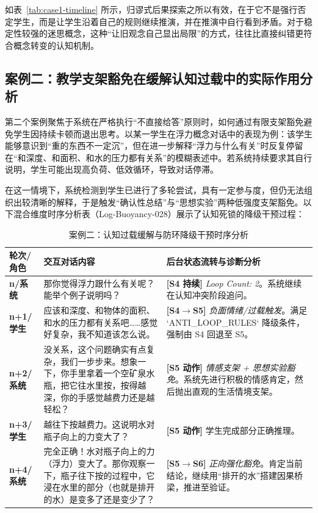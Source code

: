 如表~\ref{tab:case1-timeline} 所示，归谬式后果探索之所以有效，在于它不是强行否定学生，而是让学生沿着自己的规则继续推演，并在推演中自行看到矛盾。对于稳定性较强的迷思概念，这种“让旧观念自己显出局限”的方式，往往比直接纠错更符合概念转变的认知机制\cite{posner1982accommodation,chi1994things}。

\subsection{案例二：教学支架豁免在缓解认知过载中的实际作用分析}
\label{sec:4.6.2}

第二个案例聚焦于系统在严格执行“不直接给答”原则时，如何通过有限支架豁免避免学生因持续卡顿而退出思考。以某一学生在浮力概念对话中的表现为例：该学生能够意识到“重的东西不一定沉”，但在进一步解释“浮力与什么有关”时反复停留在“和深度、和面积、和水的压力都有关系”的模糊表述中。若系统持续要求其自行说明，学生可能出现高负荷、低效循环，导致对话停滞。

在这一情境下，系统检测到学生已进行了多轮尝试，具有一定参与度，但仍无法组织出较清晰的解释，于是触发“确认性总结”与“思想实验”两种低强度支架豁免。以下混合维度时序分析表（Log-Buoyancy-028）展示了认知死锁的降级干预过程：

\begin{table}[htbp]
    \centering
    \caption{案例二：认知过载缓解与防环降级干预时序分析}
    \label{tab:case2-timeline}
    \begin{tabular}{p{1.5cm}p{7.5cm}p{5.5cm}}
        \toprule
        \textbf{轮次/角色} & \textbf{交互对话内容} & \textbf{后台状态流转与诊断分析} \\
        \midrule
        \textbf{n/系统} & 那你觉得浮力跟什么有关呢？能举个例子说明吗？ & \textbf{[S4 持续]} \textit{Loop Count: 2}。系统继续在认知冲突阶段追问。 \\
        \midrule
        \textbf{n+1/学生} & 应该和深度、和物体的面积、和水的压力都有关系吧……感觉好复杂，我不知道该怎么说。 & \textbf{[S4$\rightarrow$S5]} \textit{负面情绪/过载触发}。满足 `ANTI_LOOP_RULES` 降级条件，强制由 S4 回退至 S5。 \\
        \midrule
        \textbf{n+2/系统} & 没关系，这个问题确实有点复杂，我们一步步来。想象一下，你手里拿着一个空矿泉水瓶，把它往水里按，按得越深，你的手感觉越费力还是越轻松？ & \textbf{[S5 动作]} \textit{情感支架 + 思想实验豁免}。系统先进行积极的情感肯定，然后抛出直观的生活情境支架。 \\
        \midrule
        \textbf{n+3/学生} & 越往下按越费力。这说明水对瓶子向上的力变大了？ & \textbf{[S5 动作]} 学生完成部分正确推理。 \\
        \midrule
        \textbf{n+4/系统} & 完全正确！水对瓶子向上的力（浮力）变大了。那你观察一下，瓶子往下按的过程中，它浸在水里的部分（也就是排开的水）是变多了还是变少了？ & \textbf{[S5$\rightarrow$S6]} \textit{正向强化豁免}。肯定当前结论，继续用“排开的水”搭建因果桥梁，推进至验证。 \\
        \bottomrule
    \end{tabular}
\end{table}

